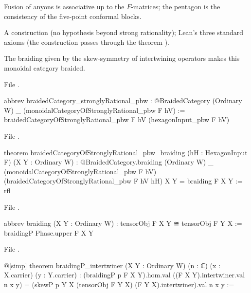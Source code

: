 \begin{physics}
Fusion of anyons is associative up to the $F$-matrices; the pentagon is the consistency of the five-point conformal
blocks.
\end{physics}

\begin{status}
A construction (no hypothesis beyond strong rationality); Lean's three standard axioms (the construction passes through
the theorem ).
\end{status}

\begin{theorem}\label{l21:thm:braided}
The braiding given by the skew-symmetry of intertwining operators makes this monoidal category braided.
\end{theorem}
\noindent File .
\begin{leancode}
abbrev braidedCategory_stronglyRational_pbw :
    @BraidedCategory (Ordinary W) _ (monoidalCategoryOfStronglyRational_pbw F hV) :=
  braidedCategoryOfStronglyRational_pbw F hV (hexagonInput_pbw F hV)
\end{leancode}

\noindent File .
\begin{leancode}
theorem braidedCategoryOfStronglyRational_pbw_braiding (hH : HexagonInput F) (X Y : Ordinary W) :
    @BraidedCategory.braiding (Ordinary W) _ (monoidalCategoryOfStronglyRational_pbw F hV)
      (braidedCategoryOfStronglyRational_pbw F hV hH) X Y = braiding F X Y := rfl
\end{leancode}
\noindent File .
\begin{leancode}
abbrev braiding (X Y : Ordinary W) : tensorObj F X Y ≅ tensorObj F Y X :=
  braidingP Phase.upper F X Y
\end{leancode}
\noindent File .
\begin{leancode}
@[simp] theorem braidingP_intertwiner (X Y : Ordinary W) (n : ℂ) (x : X.carrier)
    (y : Y.carrier) :
    (braidingP p F X Y).hom.val ((F X Y).intertwiner.val n x y) =
      (skewP p Y X (tensorObj F Y X) (F Y X).intertwiner).val n x y :=
\end{leancode}

